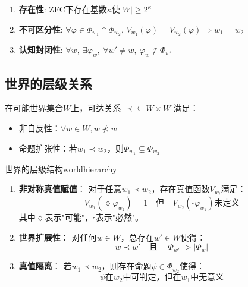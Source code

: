 \documentclass[lang=cn,newtx,10pt,scheme=chinese]{elegantbook}
\begin{document}
\begin{theorem}[世界的基本性质]
    \begin{enumerate}
        \item \textbf{存在性}: ZFC下存在基数$\kappa$使$|W| \geq 2^\kappa$
        \item \textbf{不可区分性}:
              $\forall \varphi \in \varPhi_{w_1} \cap \varPhi_{w_2},\, V_{w_1}(\varphi)=V_{w_2}(\varphi) \Rightarrow w_1 = w_2$
        \item \textbf{认知封闭性}: $\forall w,\ \exists\varphi_w,\ \forall w' \neq w,\ \varphi_w \notin \varPhi_{w'}$
    \end{enumerate}
\end{theorem}

\subsection{世界的层级关系}

\begin{definition}[可达关系]
    在可能世界集合$W$上，可达关系 $\prec \subseteq W \times W$ 满足：
    \begin{itemize}
        \item 非自反性：$\forall w \in W, w \nprec w$
        \item 命题扩张性：若$w_1 \prec w_2$，则$\varPhi_{w_1} \subsetneq \varPhi_{w_2}$
    \end{itemize}
\end{definition}

\begin{theorem}{世界的层级结构}{worldhierarchy}
    \begin{enumerate}
        \item \textbf{非对称真值赋值}：
              对于任意$w_1 \prec w_2$，存在真值函数$V_{w_i}$满足：
              \[
                  V_{w_1}(\lozenge \varphi_{w_2}) = 1 \quad \text{但} \quad V_{w_2}(\square \varphi_{w_1}) \text{未定义}
              \]
              其中$\lozenge$表示"可能"，$\square$表示"必然"。

        \item \textbf{世界扩展性}：
              对任何$w \in W$，总存在$w' \in W$使得：
              \[
                  w \prec w' \quad \text{且} \quad |\varPhi_{w'}| > |\varPhi_w|
              \]

        \item \textbf{真值隔离}：
              若$w_1 \prec w_2$，则存在命题$\psi \in \varPhi_{w_2}$使得：
              \[
                  \psi \text{在} w_2 \text{中可判定，但在} w_1 \text{中无意义}
              \]
    \end{enumerate}
\end{theorem}
\end{document}

